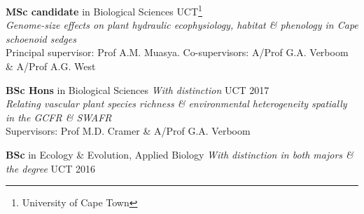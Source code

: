 \begin{hangparas}{2em}{1}

\textbf{MSc candidate} in Biological Sciences \hfill {\small UCT\footnote{University of Cape Town}} \\ %
\hspace{2em} \textit{Genome-size effects on plant hydraulic ecophysiology, habitat \&
  phenology in Cape schoenoid sedges} \\
\hspace{2em} Principal supervisor: Prof A.M. Muasya. Co-supervisors: A/Prof G.A. Verboom
  \& A/Prof A.G. West

\textbf{BSc Hons} in Biological Sciences {\small \textit{With distinction}}
                                                 \hfill {\small UCT 2017} \\
\hspace{2em} \textit{Relating vascular plant species richness \& environmental heterogeneity
  spatially in the GCFR \& SWAFR} \\
\hspace{2em} Supervisors: Prof M.D. Cramer \& A/Prof G.A. Verboom

\textbf{BSc} in Ecology \& Evolution, Applied Biology {\small \textit{With
  distinction in both majors \& the degree}}     \hfill {\small UCT 2016}

\end{hangparas}
